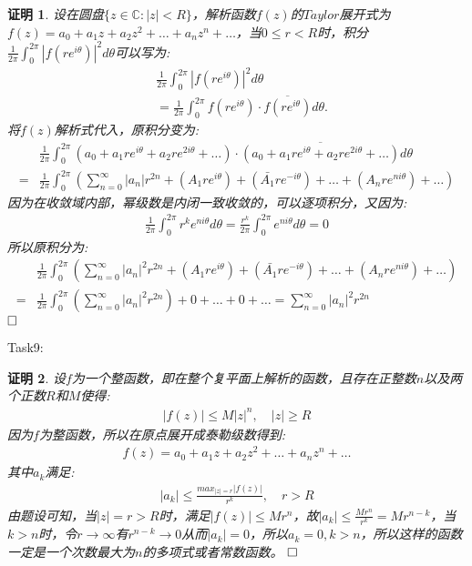 \documentclass{ctexart}
\newcommand{\。}{．} %
\newenvironment{lanse}{
    \begin{tcolorbox}[breakable,enhanced, colback=qlan, boxrule=0pt, frame hidden,
        borderline west={0.7mm}{0.1mm}{slan}]
    }
    {\end{tcolorbox}}
\theoremstyle{t} %
\newtheorem*{zmhj}{\color{slan} 证明}
\newenvironment{zm}{\begin{lanse}\begin{zmhj}}{$\hfill \square$\end{zmhj}\end{lanse}}
\begin{document}
\begin{zm}
    设在圆盘$\{z\in\mathbb{C}:|z|<R\}$，解析函数$f(z)$的$Taylor$展开式为$f(z)=a_0+a_1z+a_2z^2+\dots+a_nz^n+\dots$，当$0\le r<R$时，积分$\frac{1}{2\pi}\int_{0}^{2\pi}|f(re^{i\theta})|^2d\theta$可以写为:
    \begin{align*}
        &\frac{1}{2\pi}\int_{0}^{2\pi}|f(re^{i\theta})|^2d\theta\\
        &=\frac{1}{2\pi}\int_{0}^{2\pi}f(re^{i\theta})\cdot\overline{f(re^{i\theta})}d\theta.
    \end{align*}
    将$f(z)$解析式代入，原积分变为:
    \begin{align*}
        &\frac{1}{2\pi}\int_{0}^{2\pi}(a_0+a_1re^{i\theta}+a_2re^{2i\theta}+\dots)\cdot\overline{(a_0+a_1re^{i\theta}+a_2re^{2i\theta}+\dots)}d\theta\\
        =&\frac{1}{2\pi}\int_{0}^{2\pi}(\sum_{n=0}^{\infty}|a_n|r^{2n}+(A_1re^{i\theta})+(\bar{A_1}re^{-i\theta})+\dots+(A_nre^{ni\theta})+\dots)
    \end{align*}
    因为在收敛域内部，幂级数是内闭一致收敛的，可以逐项积分，又因为:
    \begin{align*}
        \frac{1}{2\pi}\int_{0}^{2\pi}r^ke^{ni\theta}d\theta=\frac{r^k}{2\pi}\int_{0}^{2\pi}e^{ni\theta}d\theta=0
    \end{align*}
    所以原积分为:
    \begin{align*}
        &\frac{1}{2\pi}\int_{0}^{2\pi}(\sum_{n=0}^{\infty}|a_n|^2 r^{2n}+(A_1re^{i\theta})+(\bar{A_1}re^{-i\theta})+\dots+(A_nre^{ni\theta})+\dots)\\
        =&\frac{1}{2\pi}\int_{0}^{2\pi}(\sum_{n=0}^{\infty}|a_n|^2 r^{2n})+0+\dots+0+\dots=\sum_{n=0}^{\infty}|a_n|^2 r^{2n}
    \end{align*}
\end{zm}
Task9:
\begin{zm}
    设$f$为一个整函数，即在整个复平面上解析的函数，且存在正整数$n$以及两个正数$R$和$M$使得:
    \begin{align*}
        |f(z)|\le M|z|^n,\quad |z|\ge R
    \end{align*}
    因为$f$为整函数，所以在原点展开成泰勒级数得到:
    \begin{align*}
        f(z)=a_0+a_1z+a_2z^2+\dots+a_nz^n+\dots
    \end{align*}
    其中$a_k$满足:
    \begin{align*}
        |a_k|\le \frac{max_{|z|=r}|f(z)|}{r^k},\quad r>R
    \end{align*}
    由题设可知，当$|z|=r>R$时，满足$|f(z)|\le Mr^n$，故$|a_k|\le \frac{Mr^n}{r^k}=Mr^{n-k}$，当$k>n$时，令$r\to\infty$有$r^{n-k}\to 0$从而$|a_k|=0$，所以$a_k=0,k>n$，所以这样的函数一定是一个次数最大为$n$的多项式或者常数函数。
\end{zm}
\end{document}
